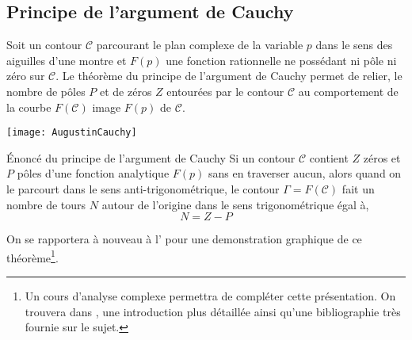 \clearpage
{}
\captionsetup{width=0.9\linewidth}
\subsection{Principe de l'argument de Cauchy}
Soit un contour $\mathcal{C}$ parcourant le plan complexe de 
la variable $p$ dans le sens des aiguilles d'une montre et $F(p)$ une fonction 
rationnelle ne possédant ni pôle ni zéro sur $\mathcal{C}$. Le théorème du 
principe de l'argument de Cauchy permet de relier, le nombre de pôles $P$ et 
de zéros $Z$ entourées par le contour $\mathcal{C}$ au comportement de la 
courbe $F(\mathcal{C})$ image $F(p)$ de $\mathcal{C}$.
\begin{marginfigure}
    \centering
    \texttt{[image: AugustinCauchy]} 
    \caption*{\textbf{Augustin Louis Cauchy} 
              (1789-1857), mathématicien français (X1807)}
\end{marginfigure}
\begin{theorem}{\'Enoncé du principe de l'argument de Cauchy
    } 
    Si un contour $\mathcal{C}$ contient $Z$ zéros et $P$ pôles d'une fonction 
    analytique $F(p)$ sans en traverser aucun, alors quand on le parcourt dans 
    le sens anti-trigonométrique, le contour $\Gamma=F(\mathcal{C})$ fait un 
    nombre de tours $N$ autour de l'origine dans le sens trigonométrique égal 
    à,
    \[ 
        N=Z-P
    \]
\end{theorem}
On se rapportera à nouveau à l' pour une demonstration 
graphique de ce théorème\footnote{Un cours d'analyse complexe permettra de 
compléter cette présentation. On trouvera dans \cite{laas_pc7bis,reg}, 
une introduction plus détaillée ainsi qu'une bibliographie très fournie 
sur le sujet.}.

